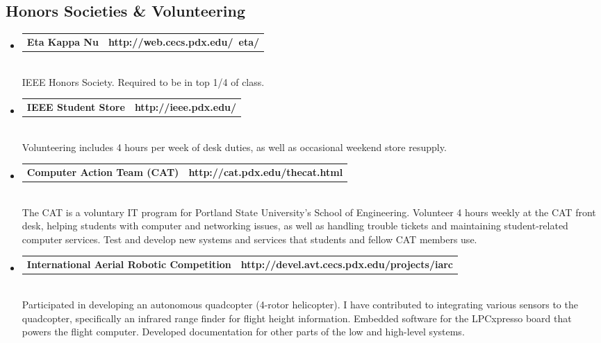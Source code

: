 \documentclass[10pt,letterpaper]{article}
\makeatletter
\newcommand{\headerrow}[2]
{\begin{tabular*}{\linewidth}{l@{\extracolsep{\fill}}r}
	#1 &
	#2 \\
\end{tabular*}}
\makeatother
\begin{document}
\subsection*{Honors Societies \& Volunteering}
\begin{itemize}
  \item
	\headerrow
		{\textbf{Eta Kappa Nu}}
		{\textbf{http://web.cecs.pdx.edu/~eta/}}
	\\
  IEEE Honors Society. Required to be in top 1/4 of class.

  \item
	\headerrow
		{\textbf{IEEE Student Store}}
		{\textbf{http://ieee.pdx.edu/}}
	\\
  Volunteering includes 4 hours per week of desk duties, as well as occasional weekend store resupply.

  \item
  \headerrow
    {\textbf{Computer Action Team (CAT)}}
		{\textbf{http://cat.pdx.edu/thecat.html}}
	\\
  The CAT is a voluntary IT program for Portland State University's School of Engineering. Volunteer 4 hours weekly at the CAT front desk, helping students with computer and networking issues, as well as handling trouble tickets and maintaining student-related computer services. Test and develop new systems and services that students and fellow CAT members use. 

  \item
  \headerrow
    {\textbf{International Aerial Robotic Competition}}
		{\textbf{http://devel.avt.cecs.pdx.edu/projects/iarc}}
	\\
  Participated in developing an autonomous quadcopter (4-rotor helicopter). I have contributed to integrating various sensors to the quadcopter, specifically an infrared range finder for flight height information. Embedded software for the LPCxpresso board that powers the flight computer. Developed documentation for other parts of the low and high-level systems.

\end{itemize}
\end{document}
